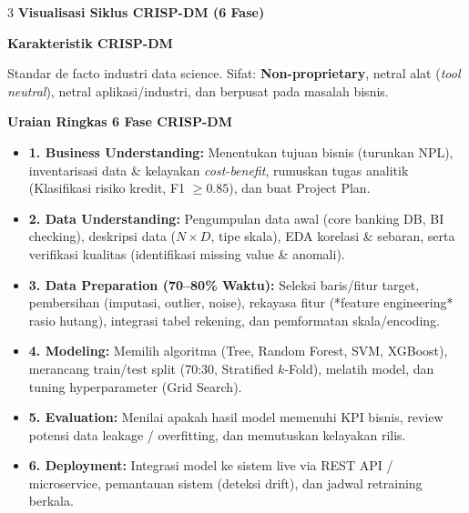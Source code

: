 \documentclass[6.8pt,landscape,a4paper]{extarticle}
\newcommand{\sdtSub}[1]{%
    \vspace{0.5pt}%
    \noindent\textbf{\fontsize{5.8pt}{6.8pt}\selectfont\color{sdtBlue}#1}\vspace{0.1pt}%
}
\begin{document}
\begin{multicols}{3}
\sdtSub{Visualisasi Siklus CRISP-DM (6 Fase)}
\begin{center}
\end{center}

\sdtSub{Karakteristik CRISP-DM}
Standar de facto industri data science. Sifat: \textbf{Non-proprietary}, netral alat (\textit{tool neutral}), netral aplikasi/industri, dan berpusat pada masalah bisnis.

\sdtSub{Uraian Ringkas 6 Fase CRISP-DM}
\begin{itemize}
    \item \textbf{1. Business Understanding:} Menentukan tujuan bisnis (turunkan NPL), inventarisasi data \& kelayakan \textit{cost-benefit}, rumuskan tugas analitik (Klasifikasi risiko kredit, F1 $\geq 0.85$), dan buat Project Plan.
    \item \textbf{2. Data Understanding:} Pengumpulan data awal (core banking DB, BI checking), deskripsi data ($N \times D$, tipe skala), EDA korelasi \& sebaran, serta verifikasi kualitas (identifikasi missing value \& anomali).
    \item \textbf{3. Data Preparation (70--80\% Waktu):} Seleksi baris/fitur target, pembersihan (imputasi, outlier, noise), rekayasa fitur (*feature engineering* rasio hutang), integrasi tabel rekening, dan pemformatan skala/encoding.
    \item \textbf{4. Modeling:} Memilih algoritma (Tree, Random Forest, SVM, XGBoost), merancang train/test split (70:30, Stratified $k$-Fold), melatih model, dan tuning hyperparameter (Grid Search).
    \item \textbf{5. Evaluation:} Menilai apakah hasil model memenuhi KPI bisnis, review potensi data leakage / overfitting, dan memutuskan kelayakan rilis.
    \item \textbf{6. Deployment:} Integrasi model ke sistem live via REST API / microservice, pemantauan sistem (deteksi drift), dan jadwal retraining berkala.
\end{itemize}


\end{multicols}
\end{document}
